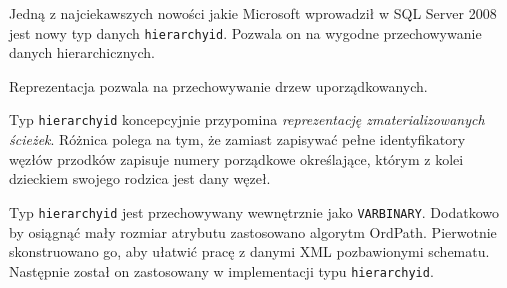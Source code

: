 
Jedną z najciekawszych nowości jakie Microsoft wprowadził w SQL Server 2008 jest nowy typ danych \texttt{hierarchyid}.
Pozwala on na wygodne przechowywanie danych hierarchicznych.






Reprezentacja pozwala na przechowywanie drzew uporządkowanych.

%


Typ \texttt{hierarchyid} koncepcyjnie przypomina \emph{reprezentację zmaterializowanych ścieżek}.
Różnica polega na tym, że zamiast zapisywać pełne identyfikatory węzłów przodków 
zapisuje numery porządkowe określające, którym z kolei dzieckiem swojego rodzica jest dany węzeł.

Typ \texttt{hierarchyid} jest przechowywany wewnętrznie jako \texttt{VARBINARY}.
Dodatkowo by osiągnąć mały rozmiar atrybutu zastosowano algorytm OrdPath\cite{ordpath,kumaran}.
Pierwotnie  skonstruowano go, aby ułatwić pracę z danymi XML pozbawionymi schematu.
Następnie został on zastosowany w implementacji typu \texttt{hierarchyid}.





%
%
%
%
%
%


